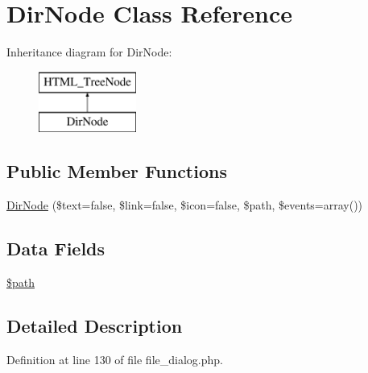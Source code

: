 \hypertarget{class_dir_node}{\section{\-Dir\-Node \-Class \-Reference}
\label{class_dir_node}
}
\-Inheritance diagram for \-Dir\-Node\-:\begin{figure}[H]
\begin{center}
\leavevmode
\includegraphics[height=2.000000cm]{class_dir_node}
\end{center}
\end{figure}
\subsection*{\-Public \-Member \-Functions}
\begin{DoxyCompactItemize}
\item 
\hyperlink{class_dir_node_afd9d47604f9cca7777ce4656b2a0e76e}{\-Dir\-Node} (\$text=false, \$link=false, \$icon=false, \$path, \$events=array())
\end{DoxyCompactItemize}
\subsection*{\-Data \-Fields}
\begin{DoxyCompactItemize}
\item 
\hyperlink{class_dir_node_a0a4baf0b22973c07685c3981f0d17fc4}{\$path}
\end{DoxyCompactItemize}


\subsection{\-Detailed \-Description}


\-Definition at line 130 of file file\-\_\-dialog.\-php.



